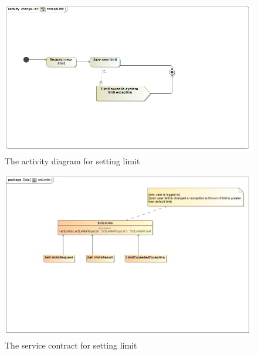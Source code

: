 \documentclass[a4paper,12pt]{article}
\begin{document}
\begin{figure}[H]
  \centering
    \includegraphics[width=1.0\textwidth]{images/changeLimit.png}
    \caption{The activity diagram for setting limit} 
\end{figure}

\begin{figure}[H]
	\centering
	\includegraphics[width=1.0\textwidth]{images/setLimitsSC.jpg}
	\caption{The service contract for setting limit}
\end{figure}
 
\end{document}

